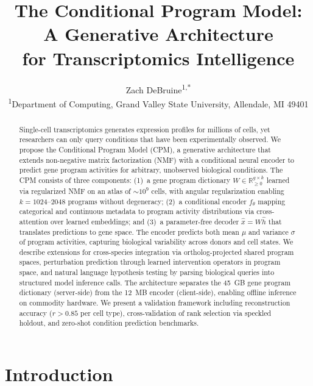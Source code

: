 \documentclass[10pt,twocolumn,letterpaper]{article}
\title{The Conditional Program Model: A Generative Architecture \\
  for Transcriptomics Intelligence}
\author{
  Zach DeBruine\textsuperscript{1,*}
  \\[6pt]
  \textsuperscript{1}Department of Computing, Grand Valley State University, Allendale, MI 49401
}
\begin{document}
\maketitle
{}

\begin{abstract}
Single-cell transcriptomics generates expression profiles for millions of cells,
yet researchers can only query conditions that have been experimentally observed.
We propose the Conditional Program Model (CPM), a generative architecture that
extends non-negative matrix factorization (NMF) with a conditional neural
encoder to predict gene program activities for arbitrary, unobserved biological
conditions. The CPM consists of three components: (1)~a gene program dictionary
$W \in \mathbb{R}_{\geq 0}^{g \times k}$ learned via regularized NMF on an
atlas of ${\sim}10^9$ cells, with angular regularization enabling $k = 1024$--$2048$
programs without degeneracy; (2)~a conditional encoder $f_\theta$ mapping
categorical and continuous metadata to program activity distributions via
cross-attention over learned embeddings; and (3)~a parameter-free decoder
$\hat{x} = W\hat{h}$ that translates predictions to gene space. The encoder
predicts both mean $\mu$ and variance $\sigma$ of program activities, capturing
biological variability across donors and cell states. We describe extensions for
cross-species integration via ortholog-projected shared program spaces,
perturbation prediction through learned intervention operators in program space,
and natural language hypothesis testing by parsing biological queries into
structured model inference calls. The architecture separates the 45~GB gene
program dictionary (server-side) from the 12~MB encoder (client-side), enabling
offline inference on commodity hardware. We present a validation framework
including reconstruction accuracy ($r > 0.85$ per cell type), cross-validation
of rank selection via speckled holdout, and zero-shot condition prediction
benchmarks.
\end{abstract}


\section{Introduction}
\label{sec:intro}
\end{document}
